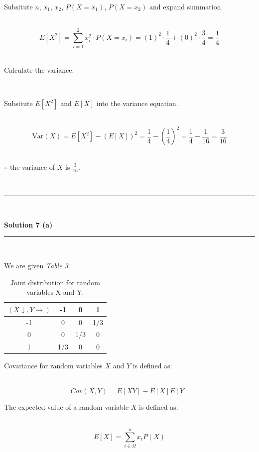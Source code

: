 \documentclass{article}
\begin{document}
\parbox{\textwidth}{Subsitute $n$, $x_1$, $x_2$, $P(X = x_1)$, $P(X = x_2)$ and expand summation.}\\

$$E[X^2] = \sum^2_{i=1} x_i^2 \cdot P(X = x_i) = (1)^2 \cdot \frac{1}{4} + (0)^2 \cdot \frac{3}{4} = \frac{1}{4}$$\\

\parbox{\textwidth}{Calculate the variance.}\\

\parbox{\textwidth}{Subsitute $E[X^2]$ and $E[X]$ into the variance equation.}\\

$$\text{Var}(X) = E[X^2] - (E[X])^2 = \frac{1}{4} - (\frac{1}{4})^2 = \frac{1}{4} - \frac{1}{16} = \frac{3}{16}$$\\

\parbox{\textwidth}{$\therefore$ the variance of $X$ is $\frac{3}{16}$.}\\

\noindent\rule{\textwidth}{0.4pt}\\

\newpage

\textbf{Solution 7 (a)}

\noindent\rule{\textwidth}{0.4pt}\\

\parbox{\textwidth}{We are given \textit{Table 3}.}

\begin{table}[h]
  \centering
  \begin{tabular}{c|ccc}
    $(X\downarrow ,Y \rightarrow)$ & -1 & 0 & 1 \\ \hline
  -1 & 0 & 0 & 1/3 \\
   0 & 0 & 1/3 & 0 \\
   1 & 1/3 & 0 & 0 \\
  \end{tabular}
  \caption{Joint distribution for random variables X and Y.}
  \label{tab:example_fractions}
\end{table}

\parbox{\textwidth}{Covariance for random variables $X$ and $Y$ is defined as:}\\

$$Cov(X,Y) = E[XY] - E[X]E[Y]$$

\parbox{\textwidth}{The expected value of a random variable $X$ is defined as:}\\

$$E[X] = \sum^{n}_{i\in \Omega} x_i P(X)$$
\end{document}
